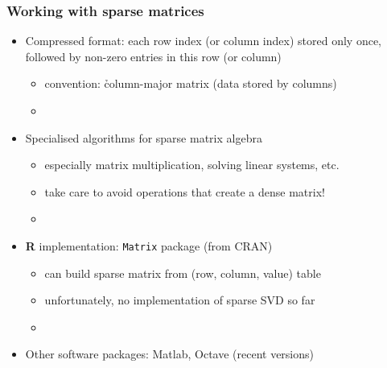 \documentclass[t]{beamer} %
\begin{document}
\begin{frame}
  \frametitle{Working with sparse matrices}

  \begin{itemize}
  \item Compressed format: each row index (or column index) stored only once,
    followed by non-zero entries in this row (or column)%
    \begin{itemize}
    \item convention: \h{column-major} matrix (data stored by columns)
    \item[]
    \end{itemize}
    \pause
  \item Specialised algorithms for sparse matrix algebra
    \begin{itemize}
    \item especially matrix multiplication, solving linear systems, etc.
    \item take care to avoid operations that create a dense matrix!
    \item[]
    \end{itemize}
    \pause
  \item \textbf{R} implementation: \texttt{Matrix} package (from CRAN)
    \begin{itemize}
    \item can build sparse matrix from (row, column, value) table
    \item unfortunately, no implementation of sparse SVD so far
    \item[]
    \end{itemize}
    \pause
  \item Other software packages: Matlab, Octave (recent versions)
  \end{itemize}
\end{frame}


\end{document}
